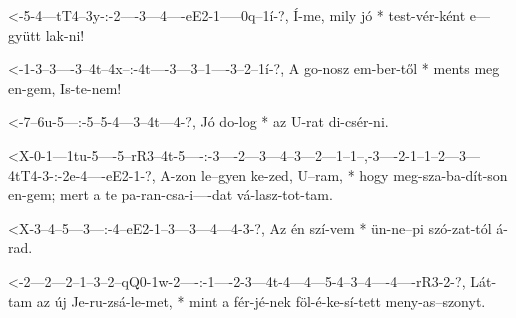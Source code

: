   {<-5-4---tT4--3y-:-2----3---4----eE2-1-----0q--1í-?,}
  {  Í-me, mily jó * test-vér-ként e---gyütt lak-ni!}

  {<-1-3--3----3--4t--4x--:-4t----3---3--1----3--2--1í-?,}
  {  A go-nosz em-ber-től * ments meg en-gem, Is-te-nem!}



  {<-7--6u-5---:-5--5-4---3--4t---4-?,}
  {  Jó do-log * az U-rat di-csér-ni.}


  {<X-0-1---1tu-5----5--rR3--4t-5----:-3----2---3---4--3---2---1--1--,-3----2-1--1--2---3---4tT4-3-:-2e-4----eE2-1-?,}
  {   A-zon le--gyen ke-zed, U--ram, * hogy meg-sza-ba-dít-son en-gem; mert a te pa-ran-csa-i----dat vá-lasz-tot-tam.}

  {<X-3--4--5---3---:-4--eE2-1--3---3---4---4-3-?,}
  {   Az én szí-vem * ün-ne--pi szó-zat-tól á-rad.}

  {<-2---2---2--1--3--2--qQ0-1w-2----:-1----2-3---4t-4---4---5-4--3--4----4----rR3-2-?,}
  {  Lát-tam az új Je-ru-zsá-le-met, * mint a fér-jé-nek föl-é-ke-sí-tett meny-as--szonyt.}